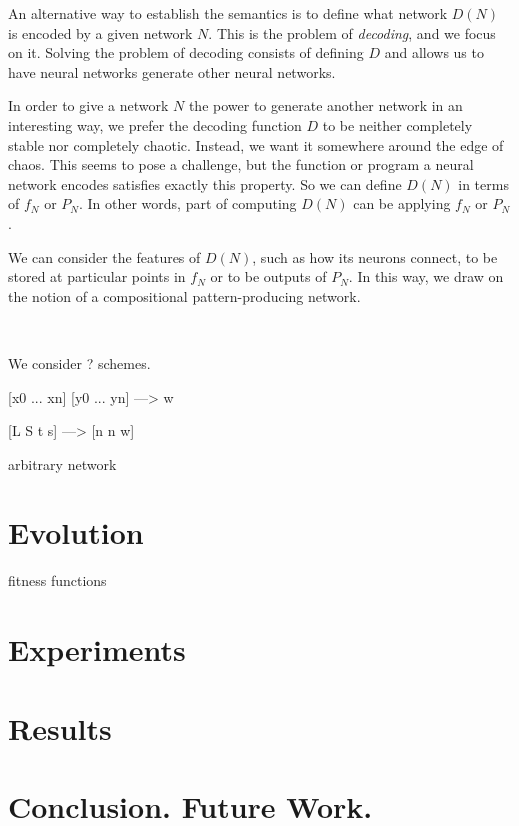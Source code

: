 \documentclass[12pt]{article}
\newcommand{\term}[1]{\emph{#1}}
\begin{document}
An alternative way to establish the semantics
is to define what network $D(N)$ is encoded
by a given network $N$.
This is the problem of \term{decoding},
and we focus on it.
Solving the problem of decoding
consists of defining $D$
and allows us to have neural networks
generate other neural networks.

In order to give a network $N$
the power to generate another network
in an interesting way,
we prefer the decoding function $D$
to be neither completely stable
nor completely chaotic.
Instead, we want it somewhere around the edge of chaos.%
\cite{langton1990edgechaos}
This seems to pose a challenge,
but the function or program a neural network encodes
satisfies exactly this property.
So we can define $D(N)$ in terms of $f_N$ or $P_N$.
In other words, part of computing $D(N)$
can be applying $f_N$ or $P_N$.

We can consider the features of $D(N)$,
such as how its neurons connect,
to be stored at particular points
in $f_N$
or to be outputs of $P_N$.
In this way,
we draw on the notion of a compositional
pattern-producing network.\cite{stanley2007cppn}

~


We consider ? schemes.

[x0 ... xn] [y0 ... yn] ---> w

[L S t s] ---> [n n w]

arbitrary network

\section*{Evolution}

fitness functions

\section*{Experiments}

\section*{Results}

\section*{Conclusion. Future Work.}



\end{document}

